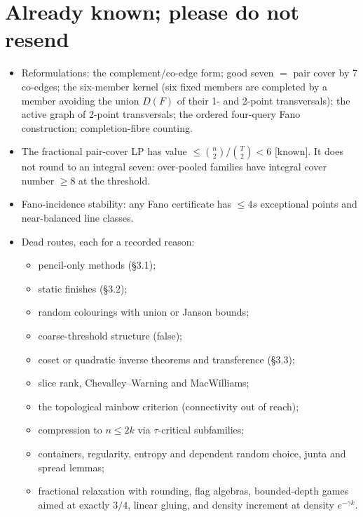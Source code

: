 \documentclass[11pt]{article}
\newcommand{\st}[1]{\textsf{\small[#1]}}
\begin{document}
\section{Already known; please do not resend}
\begin{itemize}
\item Reformulations: the complement/co-edge form; good seven $=$ pair cover by 7 co-edges; the six-member kernel (six
fixed members are completed by a member avoiding the union $D(F)$ of their 1- and 2-point transversals); the active graph
of 2-point transversals; the ordered four-query Fano construction; completion-fibre counting.
\item The fractional pair-cover LP has value $\le\binom n2/\binom T2<6$ \st{known}. It does not round to an integral seven:
over-pooled families have integral cover number $\ge8$ at the threshold.
\item Fano-incidence stability: any Fano certificate has $\le4s$ exceptional points and near-balanced line classes.
\item Dead routes, each for a recorded reason:
\begin{itemize}
\item pencil-only methods (\S3.1);
\item static finishes (\S3.2);
\item random colourings with union or Janson bounds;
\item coarse-threshold structure (false);
\item coset or quadratic inverse theorems and transference (\S3.3);
\item slice rank, Chevalley--Warning and MacWilliams;
\item the topological rainbow criterion (connectivity out of reach);
\item compression to $n\le2k$ via $\tau$-critical subfamilies;
\item containers, regularity, entropy and dependent random choice, junta and spread lemmas;
\item fractional relaxation with rounding, flag algebras, bounded-depth games aimed at exactly $3/4$, linear gluing, and
density increment at density $e^{-\gamma k}$.
\end{itemize}
\end{itemize}
\end{document}

